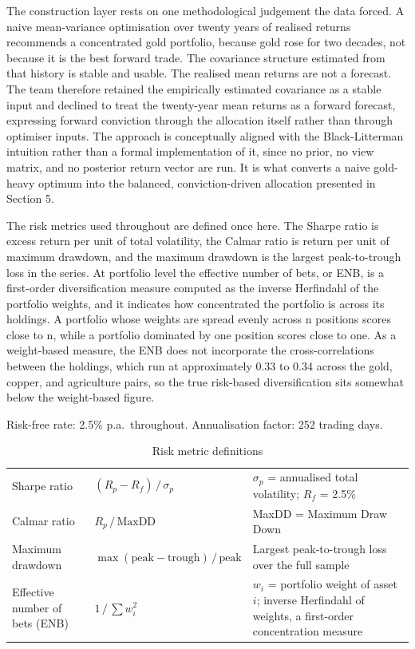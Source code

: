 \documentclass[11pt,a4paper]{article}
\begin{document}
The construction layer rests on one methodological judgement the data forced. A naive mean-variance optimisation over twenty years of realised returns recommends a concentrated gold portfolio, because gold rose for two decades, not because it is the best forward trade. The covariance structure estimated from that history is stable and usable. The realised mean returns are not a forecast. The team therefore retained the empirically estimated covariance as a stable input and declined to treat the twenty-year mean returns as a forward forecast, expressing forward conviction through the allocation itself rather than through optimiser inputs. The approach is conceptually aligned with the Black-Litterman intuition rather than a formal implementation of it, since no prior, no view matrix, and no posterior return vector are run. It is what converts a naive gold-heavy optimum into the balanced, conviction-driven allocation presented in Section 5.

The risk metrics used throughout are defined once here. The Sharpe ratio is excess return per unit of total volatility, the Calmar ratio is return per unit of maximum drawdown, and the maximum drawdown is the largest peak-to-trough loss in the series. At portfolio level the effective number of bets, or ENB, is a first-order diversification measure computed as the inverse Herfindahl of the portfolio weights, and it indicates how concentrated the portfolio is across its holdings. A portfolio whose weights are spread evenly across n positions scores close to n, while a portfolio dominated by one position scores close to one. As a weight-based measure, the ENB does not incorporate the cross-correlations between the holdings, which run at approximately 0.33 to 0.34 across the gold, copper, and agriculture pairs, so the true risk-based diversification sits somewhat below the weight-based figure.

Risk-free rate: 2.5\% p.a.\ throughout. Annualisation factor: 252 trading days.

\begin{table}[htbp]
\caption{Risk metric definitions}
\small
\begin{tabularx}{\linewidth}{P{3.6cm} P{4.2cm} L}
\toprule
{} &  &  \\
\midrule
Sharpe ratio & \((R_p - R_f)\,/\,\sigma_p\) & \(\sigma_p\) = annualised total volatility; \(R_f\) = 2.5\% \\
Calmar ratio & \(R_p\,/\,\mathrm{MaxDD}\) & MaxDD = Maximum Draw Down \\
Maximum drawdown & \(\max(\text{peak} - \text{trough})\,/\,\text{peak}\) & Largest peak-to-trough loss over the full sample \\
Effective number of bets (ENB) & \(1\,/\,\sum w_i^2\) & \(w_i\) = portfolio weight of asset \(i\); inverse Herfindahl of weights, a first-order concentration measure \\
\bottomrule
\end{tabularx}
\end{table}
\end{document}
